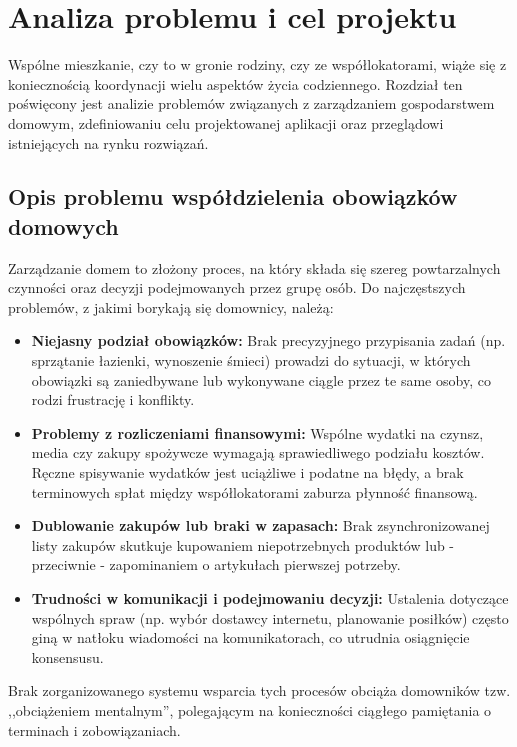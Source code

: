 \chapter{Analiza problemu i cel projektu}
\label{rozdzial1}

Wspólne mieszkanie, czy to w gronie rodziny, czy ze współlokatorami, wiąże się z koniecznością koordynacji wielu aspektów życia codziennego. Rozdział ten poświęcony jest analizie problemów związanych z zarządzaniem gospodarstwem domowym, zdefiniowaniu celu projektowanej aplikacji oraz przeglądowi istniejących na rynku rozwiązań.

\section{Opis problemu współdzielenia obowiązków domowych}

Zarządzanie domem to złożony proces, na który składa się szereg powtarzalnych czynności oraz decyzji podejmowanych przez grupę osób. Do najczęstszych problemów, z jakimi borykają się domownicy, należą:

\begin{itemize}
    \item \textbf{Niejasny podział obowiązków:} Brak precyzyjnego przypisania zadań (np. sprzątanie łazienki, wynoszenie śmieci) prowadzi do sytuacji, w których obowiązki są zaniedbywane lub wykonywane ciągle przez te same osoby, co rodzi frustrację i konflikty.
    \item \textbf{Problemy z rozliczeniami finansowymi:} Wspólne wydatki na czynsz, media czy zakupy spożywcze wymagają sprawiedliwego podziału kosztów. Ręczne spisywanie wydatków jest uciążliwe i podatne na błędy, a brak terminowych spłat między współlokatorami zaburza płynność finansową.
    \item \textbf{Dublowanie zakupów lub braki w zapasach:} Brak zsynchronizowanej listy zakupów skutkuje kupowaniem niepotrzebnych produktów lub - przeciwnie - zapominaniem o artykułach pierwszej potrzeby.
    \item \textbf{Trudności w komunikacji i podejmowaniu decyzji:} Ustalenia dotyczące wspólnych spraw (np. wybór dostawcy internetu, planowanie posiłków) często giną w natłoku wiadomości na komunikatorach, co utrudnia osiągnięcie konsensusu.
\end{itemize}

Brak zorganizowanego systemu wsparcia tych procesów obciąża domowników tzw. ,,obciążeniem mentalnym'', polegającym na konieczności ciągłego pamiętania o terminach i zobowiązaniach.

